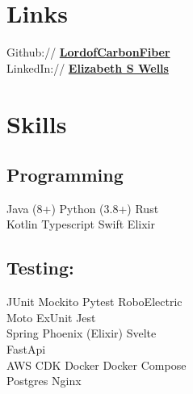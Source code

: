 \documentclass[a4paper]{deedy-resume-openfont} %
\begin{document}
\begin{minipage}[t]{0.33\textwidth}

\section{Links}

Github:// \href{https://github.com/lordofcarbonfiber}{\bf LordofCarbonFiber } \\
LinkedIn:// \href{https://www.linkedin.com/in/elizabethswells/s}{\bf Elizabeth S Wells} \\




\sectionspace %


\section{Skills}

\subsection{Programming}
Java (8+) \textbullet{} Python (3.8+) \textbullet{} Rust \\
 Kotlin \textbullet{} Typescript \textbullet{} Swift \textbullet{} Elixir
\subsection {Testing:}
JUnit \textbullet{} Mockito \textbullet{} Pytest \textbullet{} RoboElectric \\ Moto \textbullet{} ExUnit \textbullet{} Jest\\
Spring \textbullet{} Phoenix (Elixir) \textbullet{} Svelte\\ \textbullet{} FastApi\\
AWS \textbullet{} CDK \textbullet{} Docker \textbullet{} Docker Compose \\
Postgres  \textbullet{} Nginx


\sectionspace %



\end{minipage}
\end{document}

